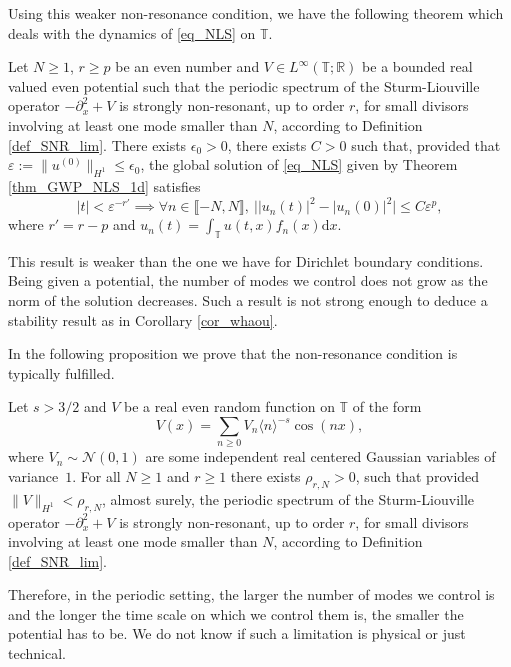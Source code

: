 Using this weaker non-resonance condition, we have the following theorem which deals with the dynamics of \eqref{eq_NLS} on $\mathbb{T}$.
\begin{theorem}[Case $\Omega = \Omega^{\mathrm{per}}_1$]
\label{thm_per_1d}
Let $N\geq 1$, $r\geq p$ be an even number and $V \in L^\infty(\mathbb{T}; \mathbb{R})$ be a bounded real valued even potential such that the periodic spectrum of the Sturm-Liouville operator $-\partial_x^2 +V$ is strongly non-resonant, up to order $r$, for small divisors involving at least one mode smaller than $N$, according to Definition \ref{def_SNR_lim}. There exists $\epsilon_0>0$, there exists $C>0$ such that, provided that $\varepsilon:= \| u^{(0)} \|_{H^1} \leq \epsilon_{0}$,
the global solution of \eqref{eq_NLS} given by Theorem \ref{thm_GWP_NLS_1d} satisfies
\[
|t|< \varepsilon^{-r'} \implies \forall n \in \llbracket-N,N \rrbracket, \ \big| |u_n(t)|^2 - |u_n(0)|^2 \big| \leq C \varepsilon^p,
\]
where $r'=r-p$ and $u_n(t) = \int_\mathbb{T} u(t,x) f_n(x) \mathrm{d}x$.
\end{theorem}
This result is weaker than the one we have for Dirichlet boundary conditions. Being given a potential, the number of modes we control does not grow as the norm of the solution decreases. Such a result is not strong enough to deduce a stability result as in Corollary \ref{cor_whaou}.

In the following proposition we prove that the non-resonance condition is typically fulfilled.

\begin{proposition}
\label{prop_proba_per_1d}
Let $s>3/2$ and $V$ be a real even random function on $\mathbb{T}$ of the form
\[
V(x) = \sum_{n \geq 0 } V_n \langle n \rangle^{-s} \cos(n x),
\]
where $V_n \sim \mathcal{N}(0,1)$ are some independent real centered Gaussian variables of variance~$1$. For all $N\!\geq\!1$ and $r\!\geq\!1$ there exists $\rho_{r,N}\!>\!0$, such that provided $\|V\|_{H^1}\!<\!\rho_{r,N}$, almost surely, the periodic spectrum of the Sturm-Liouville operator $-\partial_x^2 +V$ is strongly non-resonant, up to order $r$, for small divisors involving at least one mode smaller than $N$, according to Definition \ref{def_SNR_lim}.
\end{proposition}
Therefore, in the periodic setting, the larger the number of modes we control is and the longer the time scale on which we control them is, the smaller the potential has to be. We do not know if such a limitation is physical or just technical.


